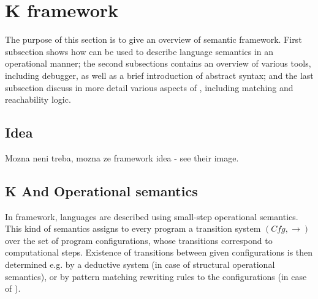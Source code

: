 \documentclass{fithesis3}
\newcommand{\var}[1]{\mathit{#1}}
\begin{document}
\section{K framework}

The purpose of this section is to give an overview of \K semantic framework. First subsection shows how \K can be used to describe language semantics in an operational manner; the second subsections contains an overview of various \K tools, including debugger, as well as a brief introduction of \K abstract syntax; and the last subsection discuss in more detail various aspects of \K, including matching and reachability logic.

\subsection{Idea}
Mozna neni treba, mozna ze 
\K framework idea - see their image.



% 




\subsection{K And Operational semantics}





In \K framework, languages are described using small-step operational semantics. This kind of semantics assigns to every program a transition system $( \var{Cfg}, \rightarrow )$ over the set of program configurations, whose transitions correspond to computational steps. Existence of transitions between given configurations is then determined e.g. by a deductive system (in case of structural operational semantics), or by pattern matching rewriting rules to the configurations (in case of \K).
\end{document}
